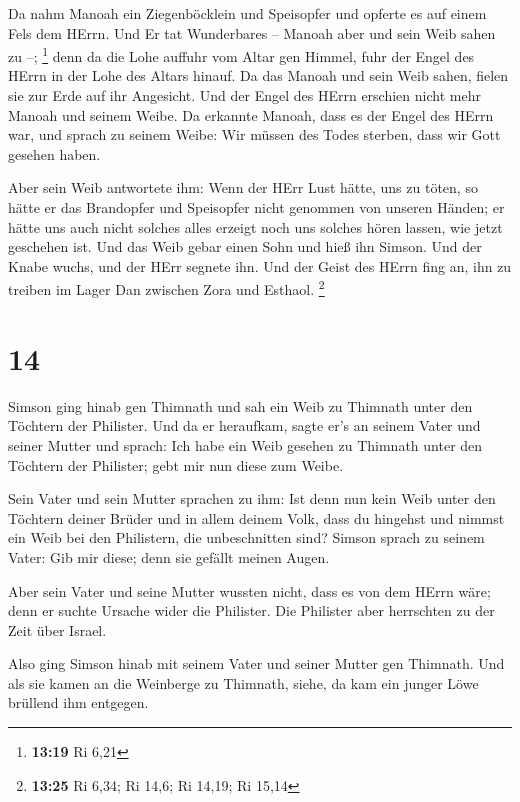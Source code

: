  Da nahm Manoah ein Ziegenböcklein und Speisopfer und
opferte es auf einem Fels dem HErrn. Und Er tat Wunderbares -- Manoah
aber und sein Weib sahen zu --; \footnote{\textbf{13:19} Ri 6,21}
 denn da die Lohe auffuhr vom Altar gen Himmel, fuhr der
Engel des HErrn in der Lohe des Altars hinauf. Da das Manoah und sein
Weib sahen, fielen sie zur Erde auf ihr Angesicht.  Und der
Engel des HErrn erschien nicht mehr Manoah und seinem Weibe. Da erkannte
Manoah, dass es der Engel des HErrn war,  und sprach zu
seinem Weibe: Wir müssen des Todes sterben, dass wir Gott gesehen haben.

 Aber sein Weib antwortete ihm: Wenn der HErr Lust hätte,
uns zu töten, so hätte er das Brandopfer und Speisopfer nicht genommen
von unseren Händen; er hätte uns auch nicht solches alles erzeigt noch
uns solches hören lassen, wie jetzt geschehen ist.  Und das
Weib gebar einen Sohn und hieß ihn Simson. Und der Knabe wuchs, und der
HErr segnete ihn.  Und der Geist des HErrn fing an, ihn zu
treiben im Lager Dan zwischen Zora und Esthaol. \footnote{\textbf{13:25}
  Ri 6,34; Ri 14,6; Ri 14,19; Ri 15,14}

\hypertarget{section-5}{%
\section{14}\label{section-5}}

 Simson ging hinab gen Thimnath und sah ein Weib zu Thimnath
unter den Töchtern der Philister.  Und da er heraufkam,
sagte er's an seinem Vater und seiner Mutter und sprach: Ich habe ein
Weib gesehen zu Thimnath unter den Töchtern der Philister; gebt mir nun
diese zum Weibe.

 Sein Vater und sein Mutter sprachen zu ihm: Ist denn nun
kein Weib unter den Töchtern deiner Brüder und in allem deinem Volk,
dass du hingehst und nimmst ein Weib bei den Philistern, die
unbeschnitten sind? Simson sprach zu seinem Vater: Gib mir diese; denn
sie gefällt meinen Augen.

 Aber sein Vater und seine Mutter wussten nicht, dass es von
dem HErrn wäre; denn er suchte Ursache wider die Philister. Die
Philister aber herrschten zu der Zeit über Israel.

 Also ging Simson hinab mit seinem Vater und seiner Mutter
gen Thimnath. Und als sie kamen an die Weinberge zu Thimnath, siehe, da
kam ein junger Löwe brüllend ihm entgegen.

